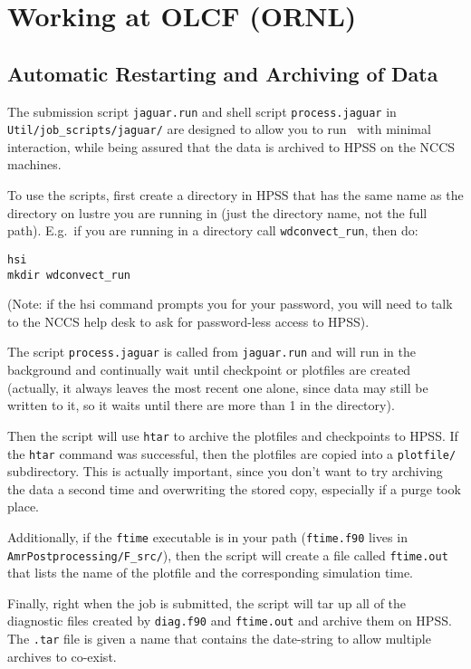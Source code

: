 \label{ch:managingjobs}

\section{Working at OLCF (ORNL)}

\subsection{Automatic Restarting and Archiving of Data}

The submission script {\tt jaguar.run} and shell script
{\tt process.jaguar} in {\tt Util/job\_scripts/jaguar/}
are designed to allow you to run \maestro\ with minimal interaction,
while being assured that the data is archived to HPSS on the NCCS
machines.

To use the scripts, first create a directory in HPSS that has the same
name as the directory on lustre you are running in (just the directory
name, not the full path).  E.g.\ if you are running in a directory
call {\tt wdconvect\_run}, then do:
\begin{verbatim}
hsi
mkdir wdconvect_run
\end{verbatim}
(Note: if the hsi command prompts you for your password, you will need to
talk to the NCCS help desk to ask for password-less access to HPSS).

The script {\tt process.jaguar} is called from {\tt jaguar.run} and
will run in the background and continually wait until checkpoint or
plotfiles are created (actually, it always leaves the most recent one
alone, since data may still be written to it, so it waits until there
are more than 1 in the directory).

Then the script will use {\tt htar} to archive the plotfiles and checkpoints
to HPSS.  If the {\tt htar} command was successful, then the plotfiles are
copied into a {\tt plotfile/} subdirectory.  This is actually important,
since you don't want to try archiving the data a second time and
overwriting the stored copy, especially if a purge took place.

Additionally, if the {\tt ftime} executable is in your path 
({\tt ftime.f90} lives in {\tt AmrPostprocessing/F\_src/}), then the
script will create a file called {\tt ftime.out} that lists the name of the
plotfile and the corresponding simulation time.

Finally, right when the job is submitted, the script will tar up all
of the diagnostic files created by {\tt diag.f90} and {\tt ftime.out}
and archive them on HPSS.  The {\tt .tar} file is given a name that
contains the date-string to allow multiple archives to co-exist.

